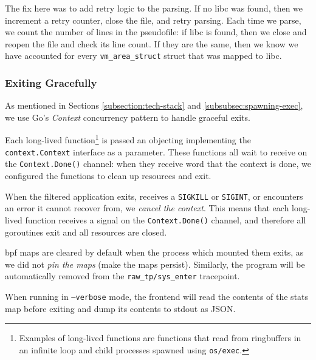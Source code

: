 The fix here was to add retry logic to the parsing. If no \ac{libc} was found,
then we increment a retry counter, close the file, and retry parsing. Each time
we parse, we count the number of lines in the pseudofile: if \ac{libc} is found,
then we close and reopen the file and check its line count. If they are the
same, then we know we have accounted for every \texttt{vm\_area\_struct} struct that was
mapped to \ac{libc}.


\subsubsection{Exiting Gracefully}

As mentioned in Sections \ref{subsection:tech-stack} and 
\ref{subsubsec:spawning-exec}, we use Go's \textit{Context} concurrency pattern
to handle graceful exits. 

Each long-lived function\footnote{Examples of long-lived functions are functions
that read from ringbuffers in an infinite loop and child processes spawned using
\texttt{os/exec}.} is passed an objecting implementing the 
\texttt{context.Context} interface as a parameter. These functions all wait to
receive on the \texttt{Context.Done()} channel: when they receive word that the
context is done, we configured the functions to clean up resources and exit. 

When the filtered application exits, receives a \texttt{SIGKILL} or 
\texttt{SIGINT}, or \af encounters an error it cannot recover from, we 
\textit{cancel the context}. This means that each long-lived function receives 
a signal on the \texttt{Context.Done()} channel, and therefore all goroutines 
exit and all resources are closed.

\ac{bpf} maps are cleared by default when the process which mounted them exits,
as we did not \textit{pin the maps} (make the maps persist). Similarly, the \af
program will be automatically removed from the \texttt{raw\_tp/sys\_enter}
tracepoint.

When running in \texttt{--verbose} mode, the frontend will read the contents of
the stats map before exiting and dump its contents to \ac{stdout} as JSON.


